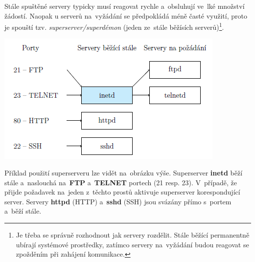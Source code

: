 Stále spuštěné servery typicky musí reagovat rychle a~obsluhují ve~lké množství žádostí. Naopak u serverů na~vyžádání se předpokládá méně časté využití, proto je spouští tzv. \emph{superserver/superdémon} (jeden ze~stále běžísích serverů)\footnote{Je třeba se správně rozhodnout jak servery rozdělit. Stále běžící permanentně ubírají systémové prostředky, zatímco servery na~vyžádání budou reagovat se zpožděním při zahájení komunikace.}.

\begin{center}
    \vspace{0,5cm}
    \includegraphics[scale=1]{images/network_server_proc.png}
\end{center}

Příklad použití superserveru lze vidět na~obrázku výše. Superserver \textbf{inetd} běží stále a~naslouchá na~\textbf{FTP} a~\textbf{TELNET} portech (21 resp. 23). V~případě, že přijde požadavek na~jeden z~těchto prostů aktivuje superserver korespondující server. Servery \textbf{httpd} (HTTP) a~\textbf{sshd} (SSH) jsou svázány přímo s~portem a~běží stále.


